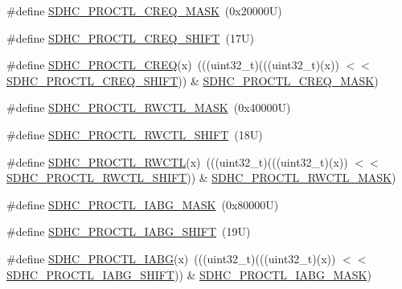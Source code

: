 \begin{DoxyCompactItemize}
\item 
\#define \mbox{\hyperlink{group___s_d_h_c___register___masks_ga6278901eea66f3db196739c4dc820644}{S\+D\+H\+C\+\_\+\+P\+R\+O\+C\+T\+L\+\_\+\+C\+R\+E\+Q\+\_\+\+M\+A\+SK}}~(0x20000\+U)
\item 
\#define \mbox{\hyperlink{group___s_d_h_c___register___masks_ga8b783b0ab48e4f66cafa6fc7da38cfbb}{S\+D\+H\+C\+\_\+\+P\+R\+O\+C\+T\+L\+\_\+\+C\+R\+E\+Q\+\_\+\+S\+H\+I\+FT}}~(17\+U)
\item 
\#define \mbox{\hyperlink{group___s_d_h_c___register___masks_ga01c1c14dee6d37dcb7e0661ea7aaea05}{S\+D\+H\+C\+\_\+\+P\+R\+O\+C\+T\+L\+\_\+\+C\+R\+EQ}}(x)~(((uint32\+\_\+t)(((uint32\+\_\+t)(x)) $<$$<$ \mbox{\hyperlink{group___s_d_h_c___register___masks_ga8b783b0ab48e4f66cafa6fc7da38cfbb}{S\+D\+H\+C\+\_\+\+P\+R\+O\+C\+T\+L\+\_\+\+C\+R\+E\+Q\+\_\+\+S\+H\+I\+FT}})) \& \mbox{\hyperlink{group___s_d_h_c___register___masks_ga6278901eea66f3db196739c4dc820644}{S\+D\+H\+C\+\_\+\+P\+R\+O\+C\+T\+L\+\_\+\+C\+R\+E\+Q\+\_\+\+M\+A\+SK}})
\item 
\#define \mbox{\hyperlink{group___s_d_h_c___register___masks_gadefa120c89ff122b91a0fda6b551930a}{S\+D\+H\+C\+\_\+\+P\+R\+O\+C\+T\+L\+\_\+\+R\+W\+C\+T\+L\+\_\+\+M\+A\+SK}}~(0x40000\+U)
\item 
\#define \mbox{\hyperlink{group___s_d_h_c___register___masks_ga3ba901ecf6267198e180a9299b4c430c}{S\+D\+H\+C\+\_\+\+P\+R\+O\+C\+T\+L\+\_\+\+R\+W\+C\+T\+L\+\_\+\+S\+H\+I\+FT}}~(18\+U)
\item 
\#define \mbox{\hyperlink{group___s_d_h_c___register___masks_ga886145e6a4b07d98f3f4ad932edf03b0}{S\+D\+H\+C\+\_\+\+P\+R\+O\+C\+T\+L\+\_\+\+R\+W\+C\+TL}}(x)~(((uint32\+\_\+t)(((uint32\+\_\+t)(x)) $<$$<$ \mbox{\hyperlink{group___s_d_h_c___register___masks_ga3ba901ecf6267198e180a9299b4c430c}{S\+D\+H\+C\+\_\+\+P\+R\+O\+C\+T\+L\+\_\+\+R\+W\+C\+T\+L\+\_\+\+S\+H\+I\+FT}})) \& \mbox{\hyperlink{group___s_d_h_c___register___masks_gadefa120c89ff122b91a0fda6b551930a}{S\+D\+H\+C\+\_\+\+P\+R\+O\+C\+T\+L\+\_\+\+R\+W\+C\+T\+L\+\_\+\+M\+A\+SK}})
\item 
\#define \mbox{\hyperlink{group___s_d_h_c___register___masks_ga837bace762b865593415b31c06dbf5c4}{S\+D\+H\+C\+\_\+\+P\+R\+O\+C\+T\+L\+\_\+\+I\+A\+B\+G\+\_\+\+M\+A\+SK}}~(0x80000\+U)
\item 
\#define \mbox{\hyperlink{group___s_d_h_c___register___masks_gaf62ddb022a19e9fe0ce3d39eeffadd4a}{S\+D\+H\+C\+\_\+\+P\+R\+O\+C\+T\+L\+\_\+\+I\+A\+B\+G\+\_\+\+S\+H\+I\+FT}}~(19\+U)
\item 
\#define \mbox{\hyperlink{group___s_d_h_c___register___masks_gaaa77261873d2cc2c480c4032110d40ee}{S\+D\+H\+C\+\_\+\+P\+R\+O\+C\+T\+L\+\_\+\+I\+A\+BG}}(x)~(((uint32\+\_\+t)(((uint32\+\_\+t)(x)) $<$$<$ \mbox{\hyperlink{group___s_d_h_c___register___masks_gaf62ddb022a19e9fe0ce3d39eeffadd4a}{S\+D\+H\+C\+\_\+\+P\+R\+O\+C\+T\+L\+\_\+\+I\+A\+B\+G\+\_\+\+S\+H\+I\+FT}})) \& \mbox{\hyperlink{group___s_d_h_c___register___masks_ga837bace762b865593415b31c06dbf5c4}{S\+D\+H\+C\+\_\+\+P\+R\+O\+C\+T\+L\+\_\+\+I\+A\+B\+G\+\_\+\+M\+A\+SK}})
$$
\end{DoxyCompactItemize}
